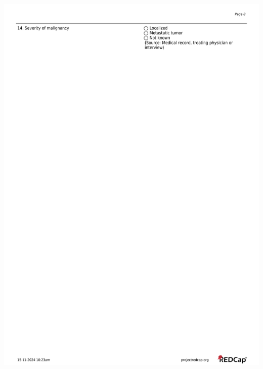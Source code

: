 \documentclass[
]{scrartcl}
\begin{document}
\includegraphics{../case-record-form/instrument-pdfs/pages/all-instruments-8.pdf}
\end{document}
